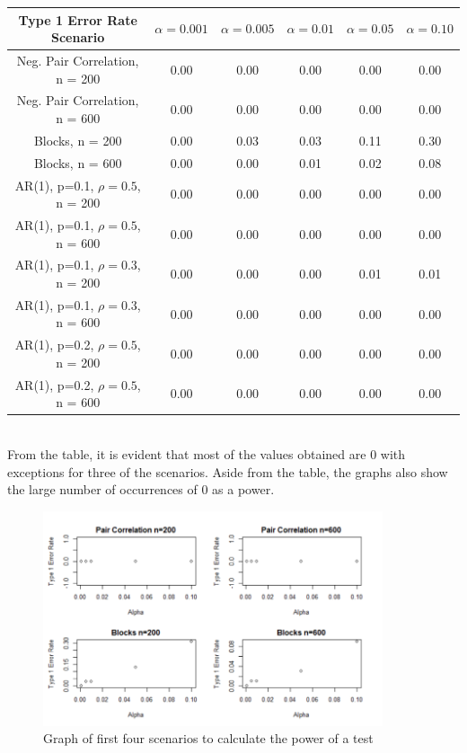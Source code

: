 \documentclass[12pt, letterpaper]{article}
\begin{document}
\begin{tabular}{|c|c|c|c|c|c|}
\hline
\textbf{Type 1 Error Rate Scenario} & $\alpha = 0.001$ &  $\alpha = 0.005$ &  $\alpha = 0.01$ &  $\alpha = 0.05$ &  $\alpha = 0.10$ \\
\hline
Neg. Pair Correlation, n = 200 & 0.00 & 0.00 & 0.00 & 0.00 & 0.00 \\
\hline
Neg. Pair Correlation, n = 600 & 0.00 & 0.00 & 0.00 & 0.00 & 0.00 \\
\hline
Blocks, n = 200 & 0.00 & 0.03 & 0.03 & 0.11 & 0.30 \\
\hline
Blocks, n = 600 & 0.00 & 0.00 & 0.01 & 0.02 & 0.08 \\
\hline
AR(1), p=0.1, $\rho = 0.5$, n = 200 & 0.00 & 0.00 & 0.00 & 0.00 & 0.00 \\
\hline
AR(1), p=0.1, $\rho = 0.5$, n = 600 & 0.00 & 0.00 & 0.00 & 0.00 & 0.00 \\
\hline
AR(1), p=0.1, $\rho = 0.3$, n = 200 & 0.00 & 0.00 & 0.00 & 0.01 & 0.01 \\
\hline
AR(1), p=0.1, $\rho = 0.3$, n = 600 & 0.00 & 0.00 & 0.00 & 0.00 & 0.00 \\
\hline
AR(1), p=0.2, $\rho = 0.5$, n = 200 & 0.00 & 0.00 & 0.00 & 0.00 & 0.00 \\
\hline
AR(1), p=0.2, $\rho = 0.5$, n = 600 & 0.00 & 0.00 & 0.00 & 0.00 & 0.00 \\
\hline
\end{tabular} \\

From the table, it is evident that most of the values obtained are 0 with exceptions for three of the scenarios.  Aside from the table, the graphs also show the large number of occurrences of 0 as a power.  \\

\begin{figure}[!hb]
\centering
\includegraphics[width=10cm]{PowerGraphs1.png}
\caption{Graph of first four scenarios to calculate the power of a test}
\label{fig: Power Graphs 1}
\end{figure}
\end{document}

